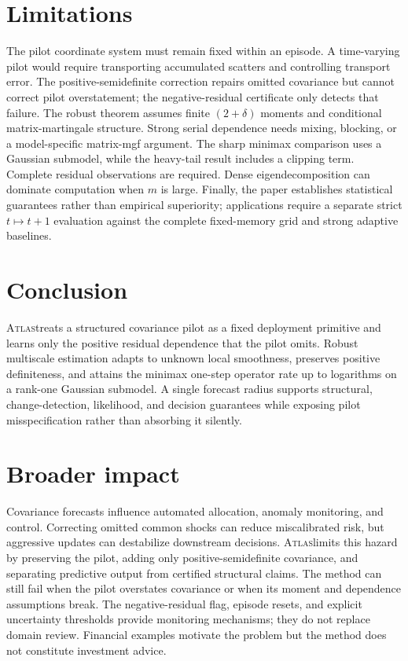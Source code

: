 \documentclass{article}
\theoremstyle{definition}
\theoremstyle{remark}
\newcommand{\ATLAS}{\textsc{Atlas}}
\begin{document}
\section{Limitations}
\label{sec:limitations}

The pilot coordinate system must remain fixed within an episode. A time-varying pilot would require transporting accumulated scatters and controlling transport error. The positive-semidefinite correction repairs omitted covariance but cannot correct pilot overstatement; the negative-residual certificate only detects that failure. The robust theorem assumes finite $(2+\delta)$ moments and conditional matrix-martingale structure. Strong serial dependence needs mixing, blocking, or a model-specific matrix-mgf argument. The sharp minimax comparison uses a Gaussian submodel, while the heavy-tail result includes a clipping term. Complete residual observations are required. Dense eigendecomposition can dominate computation when $m$ is large. Finally, the paper establishes statistical guarantees rather than empirical superiority; applications require a separate strict $t\mapsto t+1$ evaluation against the complete fixed-memory grid and strong adaptive baselines.

\section{Conclusion}

\ATLAS treats a structured covariance pilot as a fixed deployment primitive and learns only the positive residual dependence that the pilot omits. Robust multiscale estimation adapts to unknown local smoothness, preserves positive definiteness, and attains the minimax one-step operator rate up to logarithms on a rank-one Gaussian submodel. A single forecast radius supports structural, change-detection, likelihood, and decision guarantees while exposing pilot misspecification rather than absorbing it silently.

\clearpage




\appendix
{}


\section{Broader impact}
Covariance forecasts influence automated allocation, anomaly monitoring, and control. Correcting omitted common shocks can reduce miscalibrated risk, but aggressive updates can destabilize downstream decisions. \ATLAS limits this hazard by preserving the pilot, adding only positive-semidefinite covariance, and separating predictive output from certified structural claims. The method can still fail when the pilot overstates covariance or when its moment and dependence assumptions break. The negative-residual flag, episode resets, and explicit uncertainty thresholds provide monitoring mechanisms; they do not replace domain review. Financial examples motivate the problem but the method does not constitute investment advice.

\newpage
{}

\end{document}
